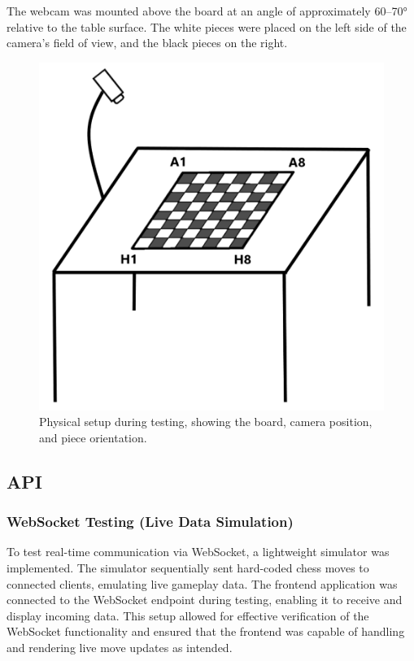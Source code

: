 The webcam was mounted above the board at an angle of approximately 60–70\si{\degree} relative to the table surface. The white pieces were placed on the left side of the camera's field of view, and the black pieces on the right.

\begin{figure}[h!]
    \centering
    \includegraphics[width=0.65\linewidth]{figures/methods/testing/setup.png}
    \caption[Setup during testing]{Physical setup during testing, showing the board, camera position, and piece orientation.}
    \label{fig:setup}
\end{figure}

\newpage

\subsection{API}
\label{subsec:api-methods}

\subsubsection*{WebSocket Testing (Live Data Simulation)}
\label{subsubsec:websocket-methods}

To test real-time communication via WebSocket, a lightweight simulator was implemented. The simulator sequentially sent hard-coded chess moves to connected clients, emulating live gameplay data. The frontend application was connected to the WebSocket endpoint during testing, enabling it to receive and display incoming data. This setup allowed for effective verification of the WebSocket functionality and ensured that the frontend was capable of handling and rendering live move updates as intended.

